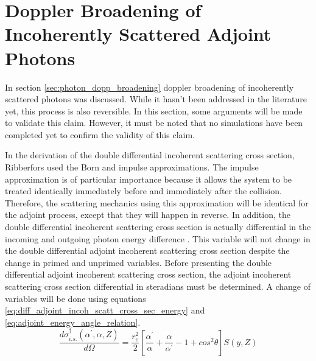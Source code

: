 \section{Doppler Broadening of Incoherently Scattered Adjoint Photons}
In section \ref{sec:photon_dopp_broadening} doppler broadening of incoherently
scattered photons was discussed. While it hasn't been addressed in the 
literature yet, this process is also reversible. In this section, some 
arguments will be made to validate this claim. However, it must be noted that
no simulations have been completed yet to confirm the validity of this claim. 

In the derivation of the double differential incoherent scattering cross 
section, Ribberfors used the Born and impulse approximations. The impulse 
approximation is of particular importance because it allows the system to be
treated identically immediately before and immediately after the collision.
Therefore, the scattering mechanics using this approximation will be identical
for the adjoint process, except that they will happen in reverse. In addition,
the double differential incoherent scattering cross section is actually
differential in the incoming and outgoing photon energy difference 
\citep{cooper_compton_1985}. This variable will not change in the double 
differential adjoint incoherent scattering cross section despite the change in
primed and unprimed variables. Before presenting the double differential
adjoint incoherent scattering cross section, the adjoint incoherent scattering
cross section differential in steradians must be determined. A change of 
variables will be done using equations 
\ref{eq:diff_adjoint_incoh_scatt_cross_sec_energy} and 
\ref{eq:adjoint_energy_angle_relation}.
\begin{equation}
  \frac{d\sigma_{i.s.}^{\dagger}(\alpha^{'},\alpha,Z)}{d\Omega} = 
  \frac{r_e^2}{2}\left[\frac{\alpha^{'}}{\alpha} + \frac{\alpha}{\alpha^{'}} - 1
    + cos^2\theta \right]S(y,Z)
  \label{eq:diff_adjoint_incoh_cross_sec_steradian}
\end{equation}

